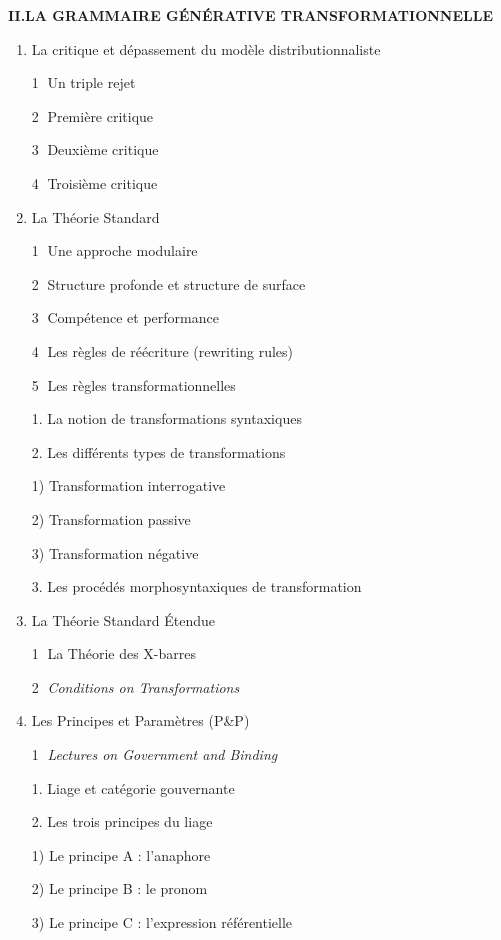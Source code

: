 \begin{keybox}
\textbf{II.\quad LA GRAMMAIRE GÉNÉRATIVE TRANSFORMATIONNELLE}
\begin{enumerate}[label=\arabic*.]
\item La critique et dépassement du modèle distributionnaliste\par
\textcircled{\scriptsize 1} Un triple rejet\par\textcircled{\scriptsize 2} Première critique\par\textcircled{\scriptsize 3} Deuxième critique\par\textcircled{\scriptsize 4} Troisième critique
\item La Théorie Standard\par
\textcircled{\scriptsize 1} Une approche modulaire\par\textcircled{\scriptsize 2} Structure profonde et structure de surface\par\textcircled{\scriptsize 3} Compétence et performance\par\textcircled{\scriptsize 4} Les règles de réécriture (rewriting rules)\par\textcircled{\scriptsize 5} Les règles transformationnelles\par\hspace*{1em}1. La notion de transformations syntaxiques\par\hspace*{1em}2. Les différents types de transformations\par\hspace*{2em}1) Transformation interrogative\par\hspace*{2em}2) Transformation passive\par\hspace*{2em}3) Transformation négative\par\hspace*{1em}3. Les procédés morphosyntaxiques de transformation
\item La Théorie Standard Étendue\par
\textcircled{\scriptsize 1} La Théorie des X-barres\par\textcircled{\scriptsize 2} \textit{Conditions on Transformations}
\item Les Principes et Paramètres (P\&P)\par
\textcircled{\scriptsize 1} \textit{Lectures on Government and Binding}\par\hspace*{1em}1. Liage et catégorie gouvernante\par\hspace*{1em}2. Les trois principes du liage\par\hspace*{2em}1) Le principe A : l’anaphore\par\hspace*{2em}2) Le principe B : le pronom\par\hspace*{2em}3) Le principe C : l’expression référentielle\par

\end{enumerate}
\end{keybox}
